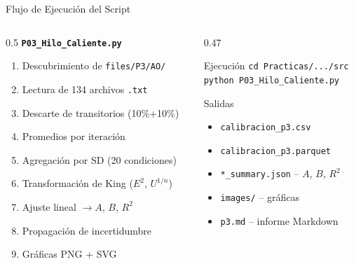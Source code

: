 \documentclass[aspectratio=169,12pt]{beamer}
\begin{document}
\begin{frame}{Flujo de Ejecución del Script}
	\begin{columns}
		\begin{column}{0.5\textwidth}
			\textbf{\texttt{P03\_Hilo\_Caliente.py}}\\[0.3em]
			\scriptsize
			\begin{enumerate}
				\item Descubrimiento de \texttt{files/P3/AO/}
				\item Lectura de 134 archivos \texttt{.txt}
				\item Descarte de transitorios (10\%+10\%)
				\item Promedios por iteración
				\item Agregación por SD (20 condiciones)
				\item Transformación de King ($E^2$, $U^{1/n}$)
				\item Ajuste lineal $\to A$, $B$, $R^2$
				\item Propagación de incertidumbre
				\item Gráficas PNG + SVG
			\end{enumerate}
		\end{column}
		\begin{column}{0.47\textwidth}
			\begin{exampleblock}{Ejecución}
				\texttt{cd Practicas/.../src}\\
				\texttt{python P03\_Hilo\_Caliente.py}
			\end{exampleblock}
			\vspace{0.3em}
			\begin{block}{Salidas}
				\scriptsize
				\begin{itemize}
					\item \texttt{calibracion\_p3.csv}
					\item \texttt{calibracion\_p3.parquet}
					\item \texttt{*\_summary.json}
					      -- $A$, $B$, $R^2$
					\item \texttt{images/} -- gráficas
					\item \texttt{p3.md} -- informe Markdown
				\end{itemize}
			\end{block}
		\end{column}
	\end{columns}
\end{frame}

\end{document}
